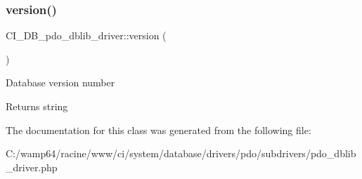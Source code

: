 \subsubsection{\texorpdfstring{version()}{version()}}
{\footnotesize\ttfamily C\+I\+\_\+\+D\+B\+\_\+pdo\+\_\+dblib\+\_\+driver\+::version (\begin{DoxyParamCaption}{ }\end{DoxyParamCaption})}

Database version number

\begin{DoxyReturn}{Returns}
string 
\end{DoxyReturn}


The documentation for this class was generated from the following file\+:\begin{DoxyCompactItemize}
\item 
C\+:/wamp64/racine/www/ci/system/database/drivers/pdo/subdrivers/pdo\+\_\+dblib\+\_\+driver.\+php\end{DoxyCompactItemize}

